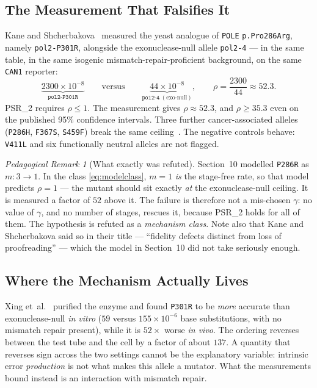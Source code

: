 \documentclass[11pt,a4paper]{article}
\theoremstyle{definition}
\theoremstyle{remark}
\newtheorem{remark}[theorem]{Pedagogical Remark}
\begin{document}
\subsection{The Measurement That Falsifies It}
Kane and Shcherbakova~\cite{kane2014} measured the yeast analogue of \texttt{POLE} \texttt{p.Pro286Arg}, namely \texttt{pol2-P301R}, alongside the exonuclease-null allele \texttt{pol2-4} --- in the same table, in the same isogenic mismatch-repair-proficient background, on the same \texttt{CAN1} reporter:
\begin{equation}
  \underbrace{2300 \times 10^{-8}}_{\texttt{pol2-P301R}} \qquad\text{versus}\qquad \underbrace{44 \times 10^{-8}}_{\texttt{pol2-4}\ (\text{exo-null})},
  \qquad \rho = \frac{2300}{44} \approx 52.3 .
\end{equation}
PSR\_2 requires $\rho \le 1$. The measurement gives $\rho \approx 52.3$, and $\rho \ge 35.3$ even on the published 95\% confidence intervals. Three further cancer-associated alleles (\texttt{P286H}, \texttt{F367S}, \texttt{S459F}) break the same ceiling~\cite{barbari2018}. The negative controls behave: \texttt{V411L} and six functionally neutral alleles are not flagged.

\begin{remark}[What exactly was refuted]
Section~10 modelled \texttt{P286R} as $m: 3 \to 1$. In the class \eqref{eq:modelclass}, $m=1$ \emph{is} the stage-free rate, so that model predicts $\rho = 1$ --- the mutant should sit exactly \emph{at} the exonuclease-null ceiling. It is measured a factor of $52$ above it. The failure is therefore not a mis-chosen $\gamma$: no value of $\gamma$, and no number of stages, rescues it, because PSR\_2 holds for all of them. The hypothesis is refuted as a \emph{mechanism class}. Note also that Kane and Shcherbakova said so in their title --- ``fidelity defects distinct from loss of proofreading'' --- which the model in Section~10 did not take seriously enough.
\end{remark}

\subsection{Where the Mechanism Actually Lives}
Xing et~al.~\cite{xing2019} purified the enzyme and found \texttt{P301R} to be \emph{more} accurate than exonuclease-null \emph{in vitro} ($59$ versus $155 \times 10^{-6}$ base substitutions, with no mismatch repair present), while it is $52\times$ worse \emph{in vivo}. The ordering reverses between the test tube and the cell by a factor of about $137$. A quantity that reverses sign across the two settings cannot be the explanatory variable: intrinsic error \emph{production} is not what makes this allele a mutator. What the measurements bound instead is an interaction with mismatch repair.
\end{document}
